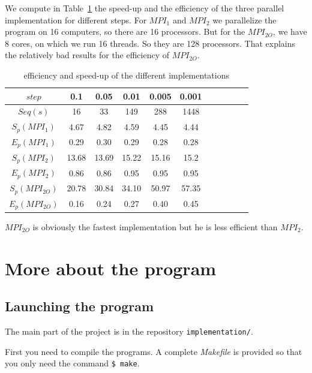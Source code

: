\documentclass[11pt,a4paper]{article}
\begin{document}
We compute in Table~\ref{table:efficiency} the speed-up and the efficiency of the three parallel implementation for different steps. For $MPI_1$ and $MPI_2$ we parallelize the program on 16 computers, so there are 16 processors. But for the $MPI_{2O}$, we have 8 cores, on which we run 16 threads. So they are 128 processors. That explains the relatively bad results for the efficiency of $MPI_{2O}$. 

\begin{table}[h]
\centering
\begin{tabular}{|c|c|c|c|c|c|c|c|c|c|c|}
  \hline
  $step$ & 0.1 & 0.05 & 0.01 & 0.005 & 0.001\\ 
  \hline
  $Seq(s)$ & 16 & 33 & 149 & 288 & 1448\\
  \hline
   $S_p(MPI_1)$ & 4.67 & 4.82 & 4.59 & 4.45 & 4.44\\
  \hline
  $E_p(MPI_1)$ & 0.29 & 0.30 & 0.29 & 0.28 & 0.28\\
  \hline
   $S_p(MPI_2)$ & 13.68 & 13.69 & 15.22 & 15.16 & 15.2\\
  \hline
  $E_p(MPI_2)$ & 0.86 & 0.86 & 0.95 & 0.95 & 0.95\\
  \hline
   $S_p(MPI_{2O})$ & 20.78 & 30.84 & 34.10 & 50.97 & 57.35\\
  \hline
  $E_p(MPI_{2O})$ & 0.16 & 0.24 & 0.27 & 0.40 & 0.45\\
  \hline
  \end{tabular}
\caption{\label{table:efficiency} efficiency and speed-up of the different implementations}
\end{table}

$MPI_{2O}$ is obviously the fastest implementation but he is less efficient than $MPI_2$.

\newpage

\appendix

\section{More about the program}

\subsection{Launching the program}

The main part of the project is in the repository \verb_implementation/_.

First you need to compile the programs. A complete \textit{Makefile} is provided so that you only need the command \verb_$ make_.\\
\end{document}
